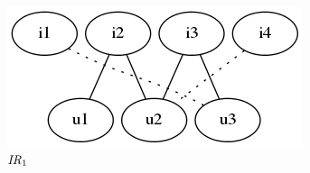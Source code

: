 \begin{figure}[h!]
    \centering
    \begin{subfigure}[h!]{0.3\textwidth}
        \includegraphics[width=\textwidth]{fig/example_run/item_user_ir1.png}
        \caption{$\mathit{IR}_1$}
    \end{subfigure}
    ~
    \begin{subfigure}[h!]{0.15\textwidth}

\end{subfigure}
\end{figure}
